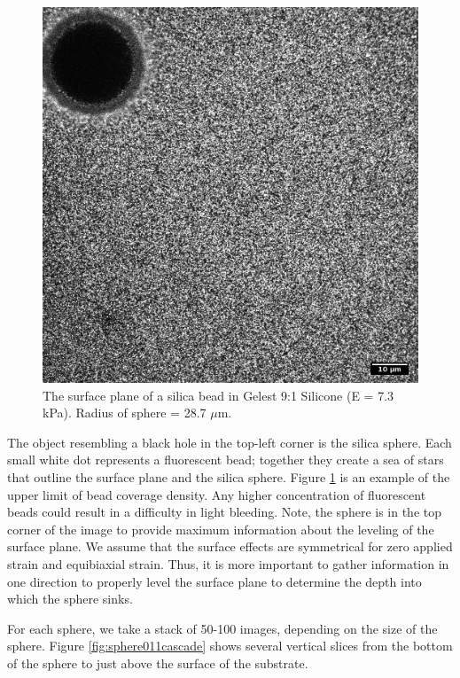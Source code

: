 \begin{figure}[h!]
	\centering
	\includegraphics[width=.75\linewidth]{Chapters/Figures/190215_g91_glass_sphere011_surface.png}
	\caption[The surface plane of a silica bead in silcone]{The surface plane of a silica bead in Gelest 9:1 Silicone (E = 7.3 kPa). Radius of sphere = 28.7 $\mu$m.}
	\label{fig:190215g91glasssphere011surface}
\end{figure}
The object resembling a black hole in the top-left corner is the silica sphere. Each small white dot represents a fluorescent bead; together they create a sea of stars that outline the surface plane and the silica sphere. Figure \ref{fig:190215g91glasssphere011surface} is an example of the upper limit of bead coverage density. Any higher concentration of fluorescent beads could result in a difficulty in light bleeding. Note, the sphere is in the top corner of the image to provide maximum information about the leveling of the surface plane. We assume that the surface effects are symmetrical for zero applied strain and equibiaxial strain. Thus, it is more important to gather information in one direction to properly level the surface plane to determine the depth into which the sphere sinks. 

For each sphere, we take a stack of 50-100 images, depending on the size of the sphere. Figure \ref{fig:sphere011cascade} shows several vertical slices from the bottom of the sphere to just above the surface of the substrate.


